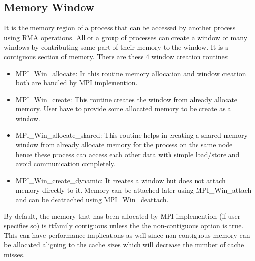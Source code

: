 \documentclass[12pt]{article}
\begin{document}
\subsection{Memory Window}
It is the memory region of a process that can be accessed by another process using RMA operations. All or a group of processes can 
create a window or many windows by contributing some part of their memory to the window. It is a contiguous section of memory. There
are these $4$ window creation routines:
\begin{itemize}
    \item {\ttfamily MPI\_Win\_allocate:} In this routine memory allocation and window creation both are handled by MPI implemention.
    \item {\ttfamily MPI\_Win\_create:} This routine creates the window from already allocate memory. User have to provide some allocated
    memory to be create as a window.
    \item {\ttfamily MPI\_Win\_allocate\_shared:} This routine helps in creating a shared memory window from already allocate memory for
    the process on the same node hence these process can access each other data with simple load/store and avoid communication completely.
    \item {\ttfamily MPI\_Win\_create\_dynamic:} It creates a window but does not attach memory directly to it. Memory can be attached later
    using {\ttfamily MPI\_Win\_attach} and can be deattached using {\ttfamily MPI\_Win\_deattach}. 
\end{itemize}

By default, the memory that has been allocated by MPI implemention (if user specifies so) is {ttfamily contiguous} unless the
the {\ttfamily non-contiguous} option is {\ttfamily true.} This can have performance implications as well since {\ttfamily non-contiguous}
memory can be allocated aligning to the cache sizes which will decrease the number of cache misses.
\end{document}
